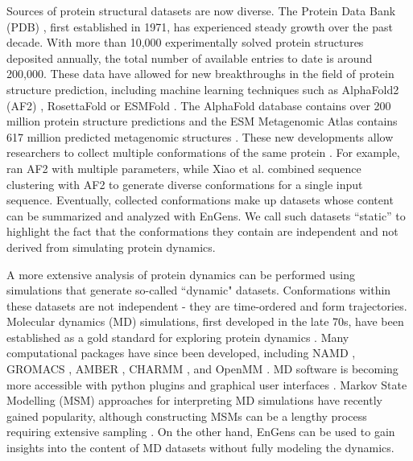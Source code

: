 \documentclass[unnumsec,webpdf,contemporary,large,numsquare]{oup-authoring-template}%
\theoremstyle{thmstyleone}%
\theoremstyle{thmstyletwo}%
\theoremstyle{thmstylethree}%
\begin{document}
Sources of protein structural datasets are now diverse. The Protein Data Bank (PDB) \citep{wwpdb_consortium_protein_2019, burley_rcsb_2021}, first established in 1971, has experienced steady growth over the past decade. With more than 10,000 experimentally solved protein structures deposited annually, the total number of available entries to date is around 200,000. These data have allowed for new breakthroughs in the field of protein structure prediction, including machine learning techniques such as AlphaFold2 (AF2) \citep{jumper_highly_2021}, RosettaFold \citep{baek_accurate_2021} or ESMFold \citep{lin_evolutionary-scale_2022}. The AlphaFold database contains over 200 million protein structure predictions and the ESM Metagenomic Atlas contains 617 million predicted metagenomic structures \citep{varadi_alphafold_2022}. These new developments allow researchers to collect multiple conformations of the same protein  \citep{takei_how_2022, xiao_utilization_2022, mikhaylov_accurate_2023, wayment-steele_prediction_2022}. For example, \citet{takei_how_2022} ran AF2 with multiple parameters, while Xiao et al. \citep{xiao_utilization_2022} combined sequence clustering with AF2 to generate diverse conformations for a single input sequence. Eventually, collected conformations make up datasets whose content can be summarized and analyzed with EnGens.  We call such datasets ``static'' to highlight the fact that the conformations they contain are independent and not derived from simulating protein dynamics.

A more extensive analysis of protein dynamics can be performed using simulations that generate so-called ``dynamic" datasets. Conformations within these datasets are not independent - they are time-ordered and form trajectories. Molecular dynamics (MD) simulations, first developed in the late 70s, have been established as a gold standard for exploring protein dynamics \citep{warshel_theoretical_1976}. Many computational packages have since been developed, including NAMD \citep{phillips_scalable_2020}, GROMACS \citep{bekker_gromacs_1993, berendsen_gromacs_1995}, AMBER \citep{salomon-ferrer_overview_2013}, CHARMM \citep{brooks_charmm_2009}, and OpenMM \citep{eastman_openmm_2017}. MD software is becoming more accessible with python plugins and graphical user interfaces \citep{barhaghi_py-mcmd_2022}. Markov State Modelling (MSM) approaches for interpreting MD simulations have recently gained popularity, although constructing MSMs can be a lengthy process requiring extensive sampling \citep{prinz_markov_2011}. On the other hand, EnGens can be used to gain insights into the content of MD datasets without fully modeling the dynamics.
\end{document}
